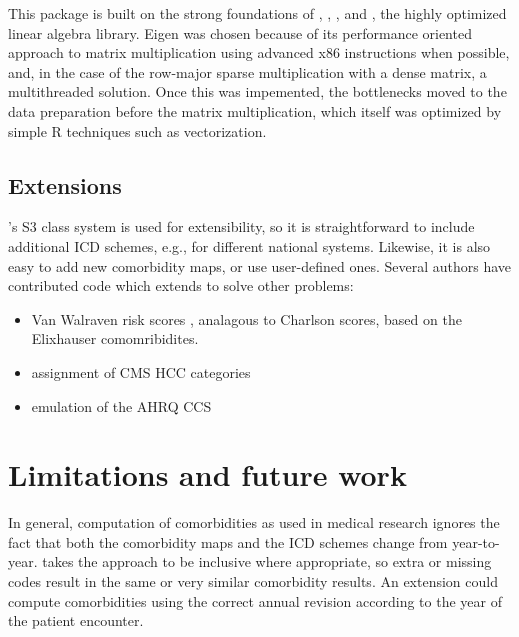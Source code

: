 \documentclass[article]{jss}
\providecommand{\tightlist}{%
  \setlength{\itemsep}{0pt}\setlength{\parskip}{0pt}}
\begin{document}
This package is built on the strong foundations of 
\citep{R_2018}, 
\citep{Eddelbuettel_RcppSeamlessIntegration_2011}, 
\citep{Eddelbeuttel_FastElegantNumerical_2013}, and 
\citep*{eigenweb}, the highly optimized  linear algebra
library. Eigen was chosen because of its performance oriented approach
to matrix multiplication using advanced x86 instructions when possible,
and, in the case of the row-major sparse multiplication with a dense
matrix, a multithreaded solution. Once this was impemented, the
bottlenecks moved to the data preparation before the matrix
multiplication, which itself was optimized by simple R techniques such
as vectorization.

\subsection{Extensions}\label{extensions}

's S3 class system is used for extensibility, so it is
straightforward to include additional ICD schemes, e.g., for different
national systems. Likewise, it is also easy to add new comorbidity maps,
or use user-defined ones. Several authors have contributed code which
extends  to solve other problems:

\begin{itemize}
\tightlist
\item
  Van Walraven risk scores
  \citep{vanwalraven_modificationelixhausercomorbidity_2009}, analagous
  to Charlson scores, based on the Elixhauser comomribidites.
\item
  assignment of CMS HCC categories
  \citep{Evans_EvaluationCMSHCCRisk_2011, Pope_RiskadjustmentMedicare_2004}
\item
  emulation of the AHRQ CCS
  \citep{AgencyforHealthcareResearchandQuality_ClinicalClassificationsSoftware_2012}
\end{itemize}

\section{Limitations and future work}\label{limitations-and-future-work}

In general, computation of comorbidities as used in medical research
ignores the fact that both the comorbidity maps and the ICD schemes
change from year-to-year.  takes the approach to be inclusive
where appropriate, so extra or missing codes result in the same or very
similar comorbidity results. An extension could compute comorbidities
using the correct annual revision according to the year of the patient
encounter.
\end{document}
